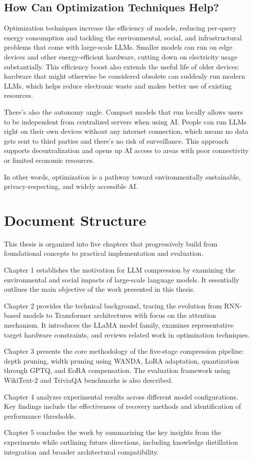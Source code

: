\subsection{How Can Optimization Techniques Help?}
Optimization techniques increase the efficiency of models, reducing per-query energy consumption and tackling the environmental, social, and infrastructural problems that come with large-scale LLMs. Smaller models can run on edge devices and other energy-efficient hardware, cutting down on electricity usage substantially. This efficiency boost also extends the useful life of older devices: hardware that might otherwise be considered obsolete can suddenly run modern LLMs, which helps reduce electronic waste and makes better use of existing resources.

There's also the autonomy angle. Compact models that run locally allows users to be independent from centralized servers when using AI. People can run LLMs right on their own devices without any internet connection, which means no data gets sent to third parties and there's no risk of surveillance. This approach supports decentralization and opens up AI access to areas with poor connectivity or limited economic resources.

In other words, optimization is a pathway toward environmentally sustainable, privacy-respecting, and widely accessible AI.


\section{Document Structure}
This thesis is organized into five chapters that progressively build from foundational concepts to practical implementation and evaluation.

Chapter 1 establishes the motivation for LLM compression by examining the environmental and social impacts of large-scale language models. It essentially outlines the main objective of the work presented in this thesis.

Chapter 2 provides the technical background, tracing the evolution from RNN-based models to Transformer architectures with focus on the attention mechanism. It introduces the LLaMA model family, examines representative target hardware constraints, and reviews related work in optimization techniques.

Chapter 3 presents the core methodology of the five-stage compression pipeline: depth pruning, width pruning using WANDA, LoRA adaptation, quantization through GPTQ, and EoRA compensation. The evaluation framework using WikiText-2 and TriviaQA benchmarks is also described.

Chapter 4 analyzes experimental results across different model configurations. Key findings include the effectiveness of recovery methods and identification of performance thresholds.

Chapter 5 concludes the work by summarizing the key insights from the experiments while outlining future directions, including knowledge distillation integration and broader architectural compatibility.